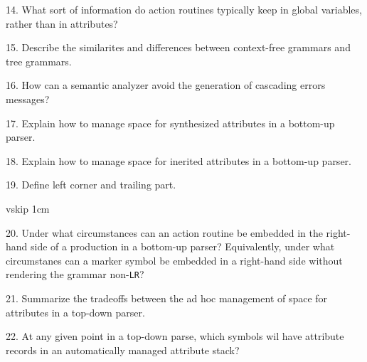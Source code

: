 \filbreak
\vskip 1cm

14. What sort of information do action routines typically keep in global variables, rather than in attributes?

\filbreak
\vskip 1cm

15. Describe the similarites and differences between context-free grammars and tree grammars.

\filbreak
\vskip 1cm

16. How can a semantic analyzer avoid the generation of cascading errors messages?

\filbreak
\vskip 1cm

17. Explain how to manage space for synthesized attributes in a bottom-up parser.

\filbreak
\vskip 1cm

18. Explain how to manage space for inerited attributes in a bottom-up parser.

\filbreak
\vskip 1cm

19. Define left corner and trailing part.

\filbreak
vskip 1cm

20. Under what circumstances can an action routine be embedded in the right-hand side of a production in a bottom-up parser? Equivalently, under what circumstanes can a marker symbol be embedded in a right-hand side without rendering the grammar non-{\tt LR}?

\filbreak
\vskip 1cm

21. Summarize the tradeoffs between the ad hoc management of space for attributes in a top-down parser.

\filbreak
\vskip 1cm

22. At any given point in a top-down parse, which symbols wil have attribute records in an automatically managed attribute stack?

\filbreak
\vskip 1cm
\filbreak
\vfill\eject
\bye

